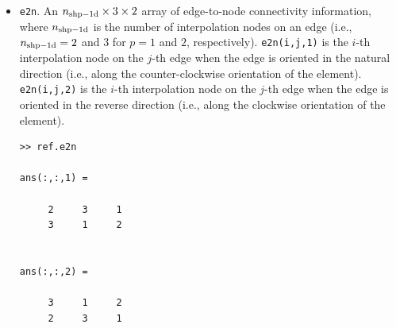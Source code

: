 \documentclass[openany,preprint,11pt]{article}
\begin{document}
\begin{itemize}
\item \texttt{e2n}. An $n_{\rm shp-1d} \times 3 \times 2$ array of edge-to-node connectivity information, where $n_{\rm shp-1d}$ is the number of interpolation nodes on an edge (i.e., $n_{\rm shp-1d} = 2$ and $3$ for $p=1$ and $2$, respectively). \texttt{e2n(i,j,1)} is the $i$-th interpolation node on the $j$-th edge when the edge is oriented in the natural direction (i.e., along the counter-clockwise orientation of the element). \texttt{e2n(i,j,2)} is the $i$-th interpolation node on the $j$-th edge when the edge is oriented in the reverse direction (i.e., along the clockwise orientation of the element).
\begin{verbatim}
>> ref.e2n

ans(:,:,1) =

     2     3     1
     3     1     2


ans(:,:,2) =

     3     1     2
     2     3     1
\end{verbatim}
\end{itemize}
\end{document}
